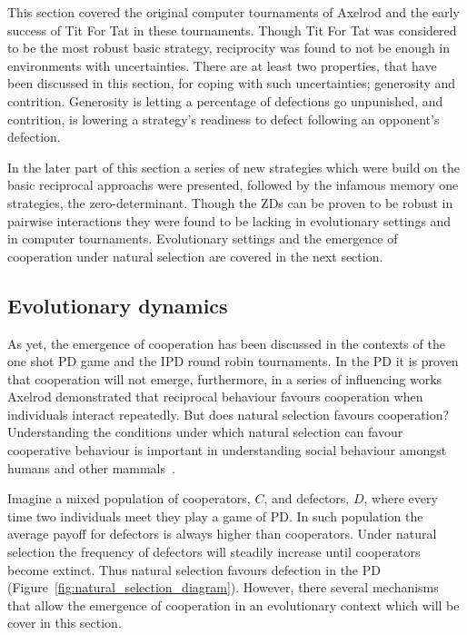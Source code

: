 \documentclass{article}
\theoremstyle{definition}
\begin{document}
This section covered the original computer tournaments of Axelrod and
the early success of Tit For Tat in these tournaments. Though Tit For Tat was
considered to be the most robust basic strategy, reciprocity was found to not
be enough in environments with uncertainties. There are at least two properties,
that have been discussed in this section, for coping with such uncertainties;
generosity and contrition. Generosity is letting a percentage of defections go
unpunished, and contrition, is lowering a strategy's readiness to defect
following an opponent's defection.

In the later part of this section a series of new strategies which were build on
the basic reciprocal approachs were presented, followed by the infamous memory
one strategies, the zero-determinant. Though the ZDs can be proven to be robust
in pairwise interactions they were found to be lacking in evolutionary settings
and in computer tournaments. Evolutionary settings and the emergence
of cooperation under natural selection are covered in the next section.

\subsection{Evolutionary dynamics}\label{subsection:evolutionary_dynamics}

As yet, the emergence of cooperation has been discussed in the contexts of the
one shot PD game and the IPD round robin tournaments. In the PD it is
proven that cooperation will not emerge, furthermore, in a series of influencing works
Axelrod demonstrated that reciprocal behaviour favours cooperation when
individuals interact repeatedly. But does natural selection favours cooperation?
Understanding the conditions under which natural selection can favour
cooperative behaviour is important in understanding social behaviour amongst
humans and other mammals~\cite{Boyd1987}.

Imagine a mixed population of cooperators, \(C\), and defectors, \(D\), where every
time two individuals meet they play a game of PD. In such population the average
payoff for defectors is always higher than cooperators. Under natural selection
the frequency of defectors will steadily increase until cooperators become
extinct. Thus natural selection favours defection in the PD
(Figure~\ref{fig:natural_selection_diagram}). However, there several mechanisms
that allow the emergence of cooperation in an evolutionary context which will be
cover in this section.
\end{document}
